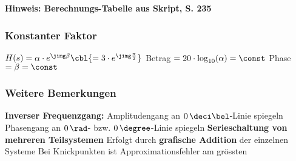 \begin{minipage}[t]{0.48\columnwidth}
    
\end{minipage}
\hfill
\begin{minipage}[t]{0.48\columnwidth}
    
\end{minipage}

\textbf{Hinweis: Berechnungs-Tabelle aus Skript, S. 235} 

\begingroup
\renewcommand{\arraystretch}{2}
\setlength{\tabcolsep}{0mm}
\endgroup
\renewcommand{\arraystretch}{1}

\vspace{0.2cm}

\begin{minipage}[t]{0.48\columnwidth}
    \raggedright
    \subsubsection{Konstanter Faktor}

    \begin{outline}
        \1 $H(s) = \alpha \cdot e^{\jimg \beta} \cbl{= 3 \cdot e^{\jimg \frac{\pi}{2}}}$
            \2 Betrag $= 20 \cdot \log_{10}(\alpha) = \const$
            \2 Phase $= \beta = \const$
    \end{outline}
    
    
\end{minipage}
\hfill
\begin{minipage}[t]{0.48\columnwidth}
    \raggedright
    \subsubsection{Weitere Bemerkungen}

    \begin{outline}
        \1 \textbf{Inverser Frequenzgang:}
            \2 Amplitudengang an $0 \, \deci \bel$-Linie spiegeln
            \2 Phasengang an $0 \, \rad$- bzw. $0 \, \degree$-Linie spiegeln
        \1 \textbf{Serieschaltung von mehreren Teilsystemen}
            \2 Erfolgt durch \textbf{grafische Addition} der einzelnen Systeme
        \1 Bei Knickpunkten ist Approximationsfehler am grössten
    \end{outline}

\end{minipage}


